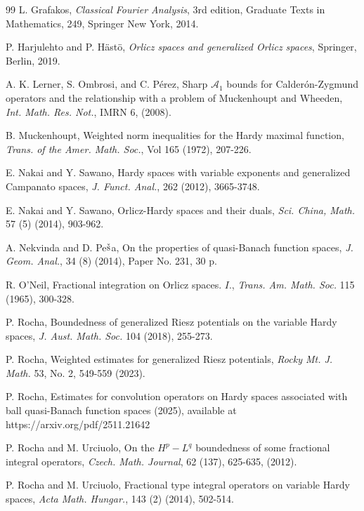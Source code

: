 \documentclass[oneside,10pt]{article}
\begin{document}
\begin{thebibliography}{99}
 L. Grafakos, \textit{Classical Fourier Analysis}, 3rd edition, Graduate Texts in Mathematics, 249, Springer New York, 2014.

 P. Harjulehto and P. H\"ast\"o, \textit{Orlicz spaces and generalized Orlicz spaces}, Springer, Berlin, 2019.

 A. K. Lerner, S. Ombrosi, and C. P\'erez, Sharp $\mathcal{A}_1$ bounds for Calder\'on-Zygmund operators and the relationship with a problem of Muckenhoupt and Wheeden, \textit{Int. Math. Res. Not.}, IMRN 6, (2008).

 B. Muckenhoupt, Weighted norm inequalities for the Hardy maximal function, \textit{Trans. of the Amer. Math. Soc.}, Vol 165 
(1972), 207-226.

 E. Nakai and Y. Sawano, Hardy spaces with variable exponents and generalized Campanato spaces, \textit{J. Funct. Anal.}, 262 
(2012), 3665-3748.

 E. Nakai and Y. Sawano, Orlicz-Hardy spaces and their duals, \textit{Sci. China, Math.} 57 (5) (2014), 903-962.

 A. Nekvinda and D. Pe$\Check{\text{s}}$a, On the properties of quasi-Banach function spaces, \textit{J. Geom. Anal.}, 34 
(8) (2014), Paper No. 231, 30 p.

 R. O'Neil, Fractional integration on Orlicz spaces. $I$., \textit{Trans. Am. Math. Soc.} 115 (1965), 300-328.

 P. Rocha, Boundedness of generalized Riesz potentials on the variable Hardy spaces, \textit{J. Aust. Math. Soc.} 104 
(2018), 255-273.

 P. Rocha, Weighted estimates for generalized Riesz potentials, \textit{Rocky Mt. J. Math.} 53, No. 2, 549-559 (2023).

 P. Rocha, Estimates for convolution operators on Hardy spaces associated with ball quasi-Banach function spaces 
(2025), available at https://arxiv.org/pdf/2511.21642

 P. Rocha and M. Urciuolo, On the $H^p - L^q$ boundedness of some fractional integral operators, \textit{Czech. Math. Journal}, 62 (137), 625-635, (2012).

 P. Rocha and M. Urciuolo, Fractional type integral operators on variable Hardy spaces, \textit{Acta Math. Hungar.}, 
143 (2) (2014), 502-514.


\end{thebibliography}
\end{document}
